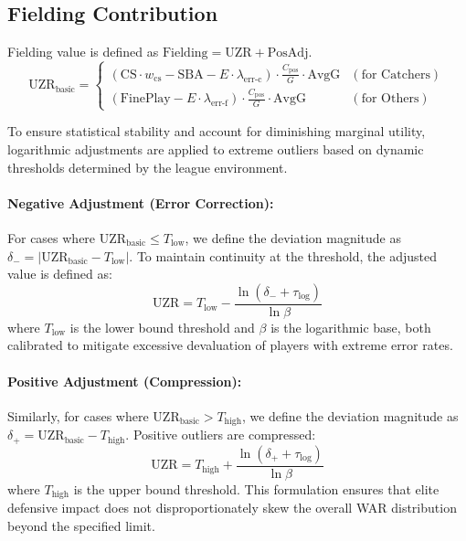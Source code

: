 \documentclass[uplatex,a4paper,11pt,dvipdfmx]{jsarticle}
\newcommand{\mvar}[1]{\mathrm{#1}}
\begin{document}
\subsection{Fielding Contribution}
Fielding value is defined as $\mvar{Fielding} = \mvar{UZR} + \mvar{PosAdj}$.
\begin{equation}
\mvar{UZR}_{\text{basic}} = \begin{cases}
(\mvar{CS} \cdot w_{\text{cs}} - \mvar{SBA} - E \cdot \lambda_{\text{err-c}}) \cdot \frac{C_{\text{pos}}}{G} \cdot \mvar{AvgG} & (\text{for Catchers}) \\
(\mvar{FinePlay} - E \cdot \lambda_{\text{err-f}}) \cdot \frac{C_{\text{pos}}}{G} \cdot \mvar{AvgG} & (\text{for Others})
\end{cases}
\end{equation}

To ensure statistical stability and account for diminishing marginal utility, logarithmic adjustments are applied to extreme outliers based on dynamic thresholds determined by the league environment.

\paragraph{Negative Adjustment (Error Correction):}
For cases where $\mvar{UZR}_{\text{basic}} \le T_{\text{low}}$, we define the deviation magnitude as $\delta_- = \lvert \mvar{UZR}_{\text{basic}} - T_{\text{low}} \rvert$. To maintain continuity at the threshold, the adjusted value is defined as:
\begin{equation}
\mvar{UZR} = T_{\text{low}} - \frac{\ln(\delta_- + \tau_{\log})}{\ln \beta}
\end{equation}
where $T_{\text{low}}$ is the lower bound threshold and $\beta$ is the logarithmic base, both calibrated to mitigate excessive devaluation of players with extreme error rates.

\paragraph{Positive Adjustment (Compression):}
Similarly, for cases where $\mvar{UZR}_{\text{basic}} > T_{\text{high}}$, we define the deviation magnitude as $\delta_+ = \mvar{UZR}_{\text{basic}} - T_{\text{high}}$. Positive outliers are compressed:
\begin{equation}
\mvar{UZR} = T_{\text{high}} + \frac{\ln(\delta_+ + \tau_{\log})}{\ln \beta}
\end{equation}
where $T_{\text{high}}$ is the upper bound threshold. This formulation ensures that elite defensive impact does not disproportionately skew the overall WAR distribution beyond the specified limit.
\end{document}
